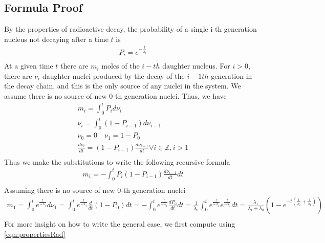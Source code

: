 \documentclass[12pt]{article}
\begin{document}
\subsection{Formula Proof}
By the properties of radioactive decay, the probability of a single i-th generation nucleus not decaying after a time $t$ is
\begin{equation}
\begin{split}
P_i = e^{-\frac{t}{\lambda_{i}}}\\
\end{split}
\end{equation}
At a given time $t$ there are $m_i$ moles of the $i-th$ daughter nucleus. For $i>0$, there are $\nu_{i}$ daughter nuclei produced by the decay of the $i-1th$ generation in the decay chain, and this is the only source of any nuclei in the system. We assume there is no source of new 0-th generation nuclei. Thus, we have
\begin{equation}\label{eqn:propertiesRad}
\begin{split}
m_i = \int_0^t P_id\nu_{i}\\
\nu_i = \int_0^t (1-P_{i-1})d\nu_{i-1}\\
\nu_0 = 0\quad \nu_1 = 1-P_0\\
\frac{d\nu_{i}}{dt} = (1-P_{i-1})\frac{d\nu_{i-1}}{dt}\forall i\in\mathbb{Z}, i>1\\
\end{split}
\end{equation}
Thus we make the substitutions to write the following recursive formula
\begin{equation}\label{eqn:recursiveForm}
\begin{split}
m_i = -\int_0^t P_i(1-P_{i-1})\frac{d\nu_{i-1}}{dt}dt\\
\end{split}
\end{equation}
Assuming there is no source of new 0-th generation nuclei
\begin{equation}
\begin{split}
m_1 = \int_0^te^{\frac{t}{-\lambda_1}}d\nu_1 = \int_0^te^{\frac{t}{-\lambda_1}}\frac{d}{dt}(1-P_0)dt = -\int_0^te^{\frac{t}{-\lambda_1}}\frac{dP_0}{dt}dt = \frac{1}{\lambda_0}\int_0^te^{\frac{t}{-\lambda_1}}e^{\frac{t}{-\lambda_0}}dt = \frac{\lambda_1}{\lambda_1+\lambda_0}(1-e^{-t(\frac{1}{\lambda_0}+\frac{1}{\lambda_1})}) \\
\end{split}
\end{equation}
For more insight on how to write the general case, we first compute using \ref{eqn:propertiesRad}
\end{document}
